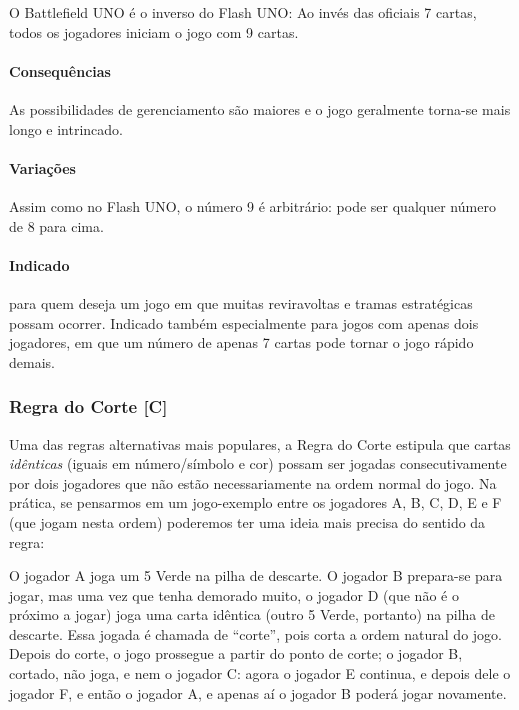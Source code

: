 O Battlefield UNO é o inverso do Flash UNO: Ao invés das oficiais 7 cartas, todos os jogadores iniciam o jogo com 9 cartas.

\paragraph{Consequências}

As possibilidades de gerenciamento são maiores e o jogo geralmente torna-se mais longo e intrincado.

\paragraph{Variações}

Assim como no Flash UNO, o número 9 é arbitrário: pode ser qualquer número de 8 para cima.

\paragraph{Indicado}

para quem deseja um jogo em que muitas reviravoltas e tramas estratégicas possam ocorrer. Indicado também especialmente para jogos com apenas dois jogadores, em que um número de apenas 7 cartas pode tornar o jogo rápido demais.

\subsubsection{Regra do Corte [C]}

Uma das regras alternativas mais populares, a Regra do Corte estipula que cartas \emph{idênticas} (iguais em número/símbolo e cor) possam ser jogadas consecutivamente por dois jogadores que não estão necessariamente na ordem normal do jogo. Na prática, se pensarmos em um jogo-exemplo entre os jogadores A, B, C, D, E e F (que jogam nesta ordem) poderemos ter uma ideia mais precisa do sentido da regra:

O jogador A joga um 5 Verde na pilha de descarte. O jogador B prepara-se para jogar, mas uma vez que tenha demorado muito, o jogador D (que não é o próximo a jogar) joga uma carta idêntica (outro 5 Verde, portanto) na pilha de descarte. Essa jogada é chamada de ``corte'', pois corta a ordem natural do jogo. Depois do corte, o jogo prossegue a partir do ponto de corte; o jogador B, cortado, não joga, e nem o jogador C: agora o jogador E continua, e depois dele o jogador F, e então o jogador A, e apenas aí o jogador B poderá jogar novamente.


